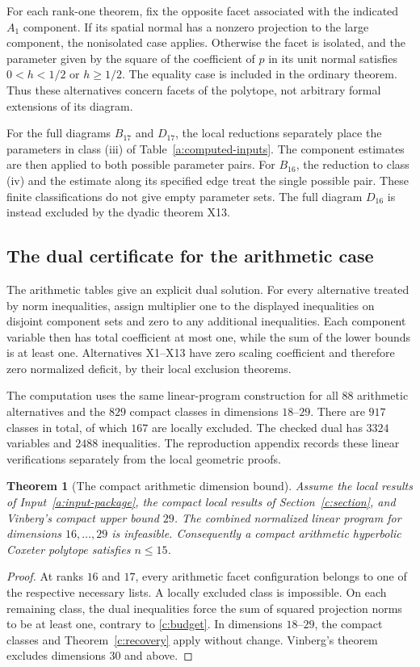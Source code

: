 \documentclass[11pt]{article}
\newtheorem{theorem}{Theorem}[section]
\theoremstyle{definition}
\theoremstyle{remark}
\numberwithin{equation}{section}
\begin{document}
For each rank-one theorem, fix the opposite facet associated with
the indicated $A_1$ component. If its spatial normal has a nonzero
projection to the large component, the nonisolated case applies.
Otherwise the facet is isolated, and the parameter given by the square
of the coefficient of $p$ in its unit normal satisfies $0<h<1/2$ or
$h\ge1/2$. The equality case is included in the ordinary theorem.
Thus these alternatives concern facets of the polytope, not arbitrary
formal extensions of its diagram.

For the full diagrams $B_{17}$ and $D_{17}$, the local reductions
separately place the parameters in class (iii) of
Table~\ref{a:computed-inputs}. The component estimates are then
applied to both possible parameter pairs. For $B_{16}$, the reduction
to class (iv) and the estimate along its specified edge treat the
single possible pair. These finite classifications do not give empty
parameter sets. The full diagram $D_{16}$ is instead excluded by the
dyadic theorem X13.

\subsection{The dual certificate for the arithmetic case}
\label{a:certificate}

The arithmetic tables give an explicit dual solution. For every
alternative treated by norm inequalities, assign multiplier one to
the displayed inequalities on disjoint component sets and zero to
any additional inequalities. Each component variable then has total
coefficient at most one, while the sum of the lower bounds is at
least one. Alternatives X1--X13 have zero scaling coefficient and
therefore zero normalized deficit, by their local exclusion theorems.

The computation uses the same linear-program construction for all
$88$ arithmetic alternatives and the $829$ compact classes in
dimensions $18$--$29$. There are $917$ classes in total, of which
$167$ are locally excluded. The checked dual has $3324$ variables
and $2488$ inequalities. The reproduction appendix records these
linear verifications separately from the local geometric proofs.

\begin{theorem}[The compact arithmetic dimension bound]\label{a:recovery}
Assume the local results of Input~\ref{a:input-package}, the compact
local results of Section~\ref{c:section}, and Vinberg's compact upper
bound $29$. The combined normalized linear program for dimensions
$16,\ldots,29$ is infeasible. Consequently a compact arithmetic
hyperbolic Coxeter polytope satisfies $n\le15$.
\end{theorem}
\begin{proof}
At ranks $16$ and $17$, every arithmetic facet configuration belongs
to one of the respective necessary lists. A locally excluded class
is impossible. On each remaining class, the dual inequalities force
the sum of squared projection norms to be at least one, contrary to
\eqref{c:budget}. In dimensions $18$--$29$, the compact classes
and Theorem~\ref{c:recovery} apply without change. Vinberg's theorem
excludes dimensions $30$ and above.
\end{proof}
\end{document}
